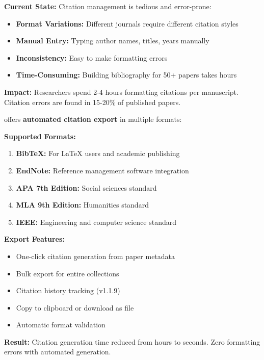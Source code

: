 \begin{warningbox}
\textbf{Current State:} Citation management is tedious and error-prone:
\begin{itemize}
    \item \textbf{Format Variations:} Different journals require different citation styles
    \item \textbf{Manual Entry:} Typing author names, titles, years manually
    \item \textbf{Inconsistency:} Easy to make formatting errors
    \item \textbf{Time-Consuming:} Building bibliography for 50+ papers takes hours
\end{itemize}

\textbf{Impact:} Researchers spend 2-4 hours formatting citations per manuscript. Citation errors are found in 15-20\% of published papers.
\end{warningbox}

\begin{successbox}
\projectname{} offers \textbf{automated citation export} in multiple formats:

\textbf{Supported Formats:}
\begin{enumerate}
    \item \textbf{BibTeX:} For LaTeX users and academic publishing
    \item \textbf{EndNote:} Reference management software integration
    \item \textbf{APA 7th Edition:} Social sciences standard
    \item \textbf{MLA 9th Edition:} Humanities standard
    \item \textbf{IEEE:} Engineering and computer science standard
\end{enumerate}

\textbf{Export Features:}
\begin{itemize}
    \item One-click citation generation from paper metadata
    \item Bulk export for entire collections
    \item Citation history tracking (v1.1.9)
    \item Copy to clipboard or download as file
    \item Automatic format validation
\end{itemize}

\textbf{Result:} Citation generation time reduced from hours to seconds. Zero formatting errors with automated generation.
\end{successbox}

